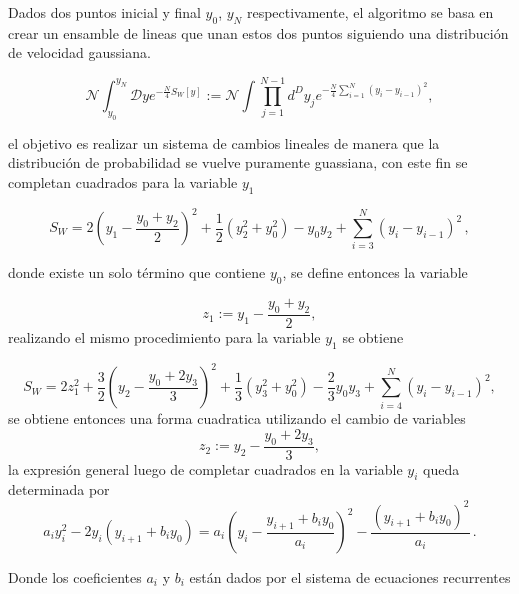 Dados dos puntos inicial y final $ y_0$, $ y_N$ respectivamente, el algoritmo se basa en crear un ensamble de lineas que unan estos dos puntos siguiendo una distribución de velocidad gaussiana.
 


\begin{equation}
\mathcal{N} \int _{y_0} ^{y_N} \mathcal{D} y 
e^{-\frac{N}{4} S _{W} [y]} :=
\mathcal{N} \int \prod _{j=1} ^{N-1} d ^{D} y _{j} e^{- \frac{N}{4} \sum _{i=1} ^{N} ( y _i - y _{i-1} )^2 } ,
\label{eq.definicion_accion_discreta}
\end{equation}

el objetivo es realizar un sistema de cambios lineales de manera que la distribución de probabilidad se vuelve puramente guassiana, con este fin se completan cuadrados para la variable $ y_1$


\begin{equation}
S _{W} = 	2 \left( y _1 - \frac{y_0 + y_2}{2} \right) ^2 + 
			\frac{1}{2} \left( y ^2 _2 + y _0 ^2 \right)   -
			y _0 y_2 +
			\sum _{i = 3} ^{N} (y _i - y _{i-1}) ^2 
\, ,
\end{equation}

donde existe un solo término que contiene $y_0$, se define entonces la variable

\begin{equation}
z _1 := y_1 - \frac{y _0  + y_2 }{2} ,
\end{equation}
realizando el mismo procedimiento para la variable $y_1$ se obtiene


\begin{equation}
S _W = 2 z_1 ^2 +
		\frac{3}{2} \left( y _2 - \frac{y _0 + 2 y_3}{3} \right) ^2 +
		\frac{1}{3} \left( y _3 ^2 + y _0 ^2 \right) -
		\frac{2}{3} y_0 y_3 +
		\sum _{i = 4} ^{N} (y _i - y _{i-1}) ^2 
		,
\end{equation}
se obtiene entonces una forma cuadratica utilizando el cambio de variables 
\begin{equation}
z _2 := y_2 - \frac{y _0  + 2 y_3 }{3} ,
\end{equation}
la expresión general luego de completar cuadrados en la variable $y_i$ queda determinada por 
\begin{equation}
a _i y _i ^2 - 2 y_i ( y _{i+1} + b _i y_0 ) =
a _i \left( y _i - \frac{y _{i+1} + b_i y_0}{a_i} \right) ^2 -
\frac{\left( y _{i+1} + b_i y_0 \right) ^2}{a _i}
\, .
\end{equation}


Donde los coeficientes $a_i$ y $b_i$ están dados por el sistema de ecuaciones recurrentes

